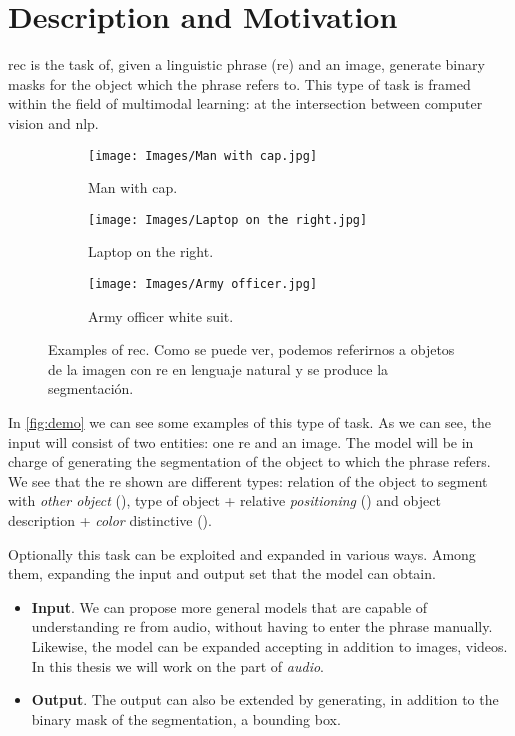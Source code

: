\section{Description and Motivation}\label{sec:description}

\gls{rec} is the task of, given a linguistic phrase (\gls{re}) and an image,
generate binary masks for the object which the phrase refers to. This type of
task is framed within the field of multimodal learning: at the intersection
between computer vision and \gls{nlp}.

\begin{figure}[htb]
  \centering
  \begin{subfigure}[t]{.32\textwidth}
    \centering
    \caption{Man with cap.}
    \texttt{[image: Images/Man with cap.jpg]}
  \end{subfigure}\hfill
  \begin{subfigure}[t]{.32\textwidth}
    \centering
    \caption{Laptop on the right.}
    \texttt{[image: Images/Laptop on the right.jpg]}
  \end{subfigure}\hfill
  \begin{subfigure}[t]{.32\textwidth}
    \centering
    \caption{Army officer white suit.}
    \texttt{[image: Images/Army officer.jpg]}
  \end{subfigure}
  \caption[Examples of \acl*{rec}]{Examples of \acl{rec}. Como se puede ver,
    podemos referirnos a objetos de la imagen con \gls{re} en lenguaje natural
    y se produce la segmentación.}
  \label{fig:demo}
\end{figure}

In \vref{fig:demo} we can see some examples of this type of task. As we can
see, the input will consist of two entities: one \gls{re} and an image. The
model will be in charge of generating the segmentation of the object to which
the phrase refers. We see that the \gls{re} shown are different types: relation
of the object to segment with \emph{other object} (), type
of object + relative \emph{positioning} () and object
description + \emph{color} distinctive ().

Optionally this task can be exploited and expanded in various ways. Among them,
expanding the input and output set that the model can obtain.
\begin{itemize}
  \item \textbf{Input}. We can propose more general models that are capable
  of understanding \gls{re} from audio, without having to enter the phrase
  manually. Likewise, the model can be expanded accepting in addition to
  images, videos. In this thesis we will work on the part of \emph{audio}.
  \item \textbf{Output}. The output can also be extended by generating, in
  addition to the binary mask of the segmentation, a bounding box.
\end{itemize}

